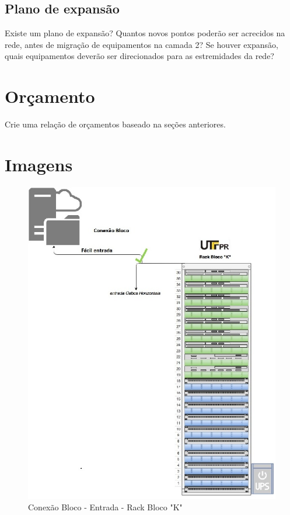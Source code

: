 \documentclass[	DIV=calc,%
							paper=a4,%
							fontsize=12pt,%
							onecolumn]{scrartcl}	 					%
\begin{document}
\subsection{Plano de expansão}
Existe um plano de expansão? Quantos novos pontos poderão ser acrecidos na rede, antes de migração de equipamentos na camada 2? Se houver expansão, quais equipamentos deverão ser direcionados para as estremidades da rede? 


\section{Orçamento}
Crie uma relação de orçamentos baseado na seções anteriores.

\section{Imagens}
\begin{figure}[!h]
	\centering
	\caption{Conexão Bloco - Entrada - Rack Bloco "K"}
	\includegraphics{entrada_1}
\end{figure}
\end{document}
